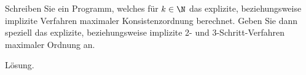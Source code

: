 \begin{exercise}
Schreiben Sie ein Programm, welches für $k \in \N$ das explizite, beziehungsweise
implizite Verfahren maximaler Konsistenzordnung berechnet. Geben Sie dann speziell
das explizite, beziehungsweise implizite 2- und 3-Schritt-Verfahren maximaler Ordnung an.
\end{exercise}
\begin{solution}
Lösung.
\end{solution}
